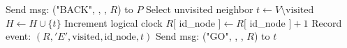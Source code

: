 \begin{algorithm}
\begin{algorithmic}[1]
                    \State Send msg: ("BACK", , , $R$) to $P$
                \EndIf
            \Else
                \State Select unvisited neighbor $t \leftarrow V \setminus \text{visited}$
                \State $H \leftarrow H \cup \{t\}$ 
                \State Increment logical clock $R[$ id\_node $] \leftarrow R[$ id\_node $] + 1$
                \State Record event: $(R, 'E', \text{visited}, \text{id\_node}, t)$
                \State Send msg: ("GO", , , $R$) to $t$
            \EndIf
        \EndIf
    \EndWhile
\end{algorithmic}
\end{algorithm}





